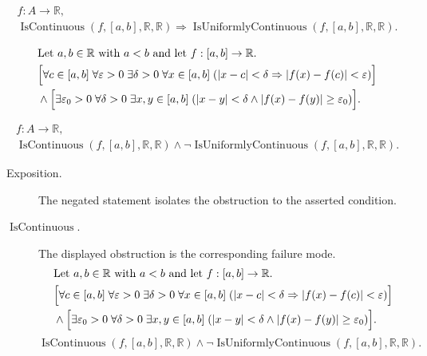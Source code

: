 \begin{remark*}
\[
\begin{aligned}
  f\colon A\to\mathbb{R},\\
\operatorname{IsContinuous}(f,[a,b],\mathbb R,\mathbb R) \Rightarrow \operatorname{IsUniformlyContinuous}(f,[a,b],\mathbb R,\mathbb R).
\end{aligned}
\]
\end{remark*}

\begin{remark*}
\[
\begin{aligned}
&\text{Let } a,b \in \mathbb{R} \text{ with } a<b \text{ and let } f:[a,b]\to\mathbb{R}.\\
&\Bigl[\forall c \in [a,b]\; \forall \varepsilon>0\; \exists \delta>0\; \forall x \in [a,b]\;(|x-c|<\delta \Rightarrow |f(x)-f(c)|<\varepsilon)\Bigr]\\
&\land \Bigl[\exists \varepsilon_0>0\; \forall \delta>0\; \exists x,y \in [a,b]\;(|x-y|<\delta \land |f(x)-f(y)| \ge \varepsilon_0)\Bigr].
\end{aligned}
\]
\end{remark*}

\begin{remark*}
\[
\begin{aligned}
  f\colon A\to\mathbb{R},\\
\operatorname{IsContinuous}(f,[a,b],\mathbb R,\mathbb R) \land \neg \operatorname{IsUniformlyContinuous}(f,[a,b],\mathbb R,\mathbb R).
\end{aligned}
\]
\end{remark*}

\begin{remark*}
\begin{description}
  \item[Exposition.]
  The negated statement isolates the obstruction to the asserted condition.

  \item[\(\operatorname{IsContinuous}.\)]
  The displayed obstruction is the corresponding failure mode.
  \[
\begin{aligned}
&\text{Let } a,b \in \mathbb{R} \text{ with } a<b \text{ and let } f:[a,b]\to\mathbb{R}.\\
&\Bigl[\forall c \in [a,b]\; \forall \varepsilon>0\; \exists \delta>0\; \forall x \in [a,b]\;(|x-c|<\delta \Rightarrow |f(x)-f(c)|<\varepsilon)\Bigr]\\
&\land \Bigl[\exists \varepsilon_0>0\; \forall \delta>0\; \exists x,y \in [a,b]\;(|x-y|<\delta \land |f(x)-f(y)| \ge \varepsilon_0)\Bigr].
\end{aligned}
  \]
  \[
\operatorname{IsContinuous}(f,[a,b],\mathbb R,\mathbb R) \land \neg \operatorname{IsUniformlyContinuous}(f,[a,b],\mathbb R,\mathbb R).
  \]
\end{description}
\end{remark*}



